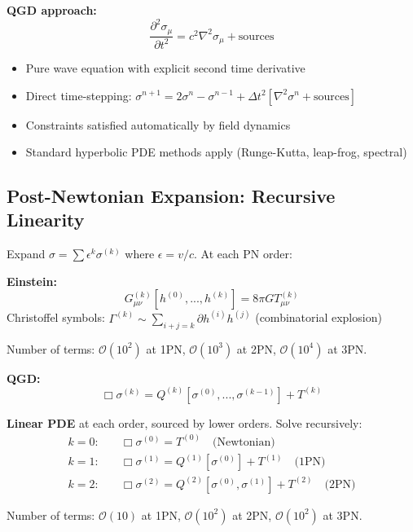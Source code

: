 \documentclass[11pt,a4paper]{article}
\theoremstyle{definition}
\theoremstyle{remark}
\begin{document}
	\textbf{QGD approach:}
	\begin{equation}
		\frac{\partial^2\sigma_\mu}{\partial t^2} = c^2\nabla^2\sigma_\mu + \text{sources}
	\end{equation}
	\begin{itemize}
		\item Pure wave equation with explicit second time derivative
		\item Direct time-stepping: $\sigma^{n+1} = 2\sigma^n - \sigma^{n-1} + \Delta t^2[\nabla^2\sigma^n + \text{sources}]$
		\item Constraints satisfied automatically by field dynamics
		\item Standard hyperbolic PDE methods apply (Runge-Kutta, leap-frog, spectral)
	\end{itemize}
	
	\subsection{Post-Newtonian Expansion: Recursive Linearity}
	
	Expand $\sigma = \sum \epsilon^k\sigma^{(k)}$ where $\epsilon = v/c$. At each PN order:
	
	\textbf{Einstein:}
	\begin{equation}
		G_{\mu\nu}^{(k)}[h^{(0)}, ..., h^{(k)}] = 8\pi G T_{\mu\nu}^{(k)}
	\end{equation}
	Christoffel symbols: $\Gamma^{(k)} \sim \sum_{i+j=k}\partial h^{(i)} h^{(j)}$ (combinatorial explosion)
	
	Number of terms: $\mathcal{O}(10^2)$ at 1PN, $\mathcal{O}(10^3)$ at 2PN, $\mathcal{O}(10^4)$ at 3PN.
	
	\textbf{QGD:}
	\begin{equation}
		\Box\sigma^{(k)} = Q^{(k)}[\sigma^{(0)}, ..., \sigma^{(k-1)}] + T^{(k)}
	\end{equation}
	
	\textbf{Linear PDE} at each order, sourced by lower orders. Solve recursively:
	\begin{align}
		k=0: &\quad \Box\sigma^{(0)} = T^{(0)} \quad \text{(Newtonian)}\\
		k=1: &\quad \Box\sigma^{(1)} = Q^{(1)}[\sigma^{(0)}] + T^{(1)} \quad \text{(1PN)}\\
		k=2: &\quad \Box\sigma^{(2)} = Q^{(2)}[\sigma^{(0)}, \sigma^{(1)}] + T^{(2)} \quad \text{(2PN)}
	\end{align}
	
	Number of terms: $\mathcal{O}(10)$ at 1PN, $\mathcal{O}(10^2)$ at 2PN, $\mathcal{O}(10^2)$ at 3PN.
	
\end{document}
